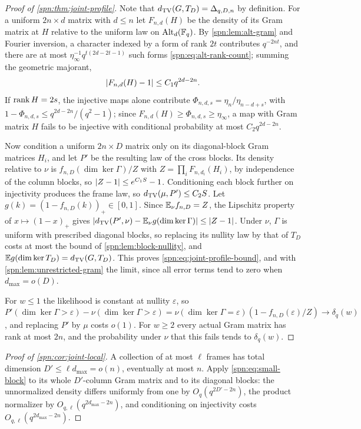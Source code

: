 \begin{proof}[Proof of \cref{spn:thm:joint-profile}]
Note that $d_{\mathrm{TV}}(G,T_D)=\Delta_{q,D,n}$ by definition. For a uniform $2n\times d$ matrix with
$d\le n$ let $F_{n,d}(H)$ be the density of its Gram matrix at $H$ relative to the uniform law on
$\operatorname{Alt}_d(\mathbb{F}_q)$. By \cref{spn:lem:alt-gram} and Fourier inversion, a character indexed by a form of
rank $2t$ contributes $q^{-2nt}$, and there are at most $\eta_\infty^{-1}q^{t(2d-2t-1)}$ such forms
\eqref{spn:eq:alt-rank-count}; summing the geometric majorant,
\begin{equation}\label{spn:eq:small-block}
 \lvert F_{n,d}(H)-1\rvert\le C_1q^{2d-2n}.
\end{equation}
If $\operatorname{rank} H=2s$, the injective maps alone contribute $\Phi_{n,d,s}=\eta_n/\eta_{n-d+s}$, with
$1-\Phi_{n,d,s}\le q^{2d-2n}/(q^2-1)$; since $F_{n,d}(H)\ge\Phi_{n,d,s}\ge\eta_\infty$, a map with Gram
matrix $H$ fails to be injective with conditional probability at most $C_2q^{2d-2n}$.

Now condition a uniform $2n\times D$ matrix only on its diagonal-block Gram matrices $H_i$, and let
$P'$ be the resulting law of the cross blocks. Its density relative to $\nu$ is
$f_{n,D}(\dim\ker\Gamma)/Z$ with $Z=\prod_iF_{n,d_i}(H_i)$, by independence of the column blocks, so
$\lvert Z-1\rvert\le e^{C_1S}-1$. Conditioning each block further on injectivity produces the frame law,
so $d_{\mathrm{TV}}(\mu,P')\le C_2S$. Let $g(k)=(1-f_{n,D}(k))_+\in[0,1]$. Since $\mathbb{E}_\nu f_{n,D}=Z$, the
Lipschitz property of $x\mapsto(1-x)_+$ gives
$\lvert d_{\mathrm{TV}}(P',\nu)-\mathbb{E}_\nu g(\dim\ker\Gamma)\rvert\le\lvert Z-1\rvert$. Under $\nu$, $\Gamma$ is uniform with
prescribed diagonal blocks, so replacing its nullity law by that of $T_D$ costs at most the bound of
\cref{spn:lem:block-nullity}, and $\mathbb{E} g(\dim\ker T_D)=d_{\mathrm{TV}}(G,T_D)$. This proves
\eqref{spn:eq:joint-profile-bound}, and with \cref{spn:lem:unrestricted-gram} the limit, since all
error terms tend to zero when $d_{\max}=o(D)$.

For $w\le1$ the likelihood is constant at nullity $\varepsilon$, so
$P'(\dim\ker\Gamma>\varepsilon)-\nu(\dim\ker\Gamma>\varepsilon)=\nu(\dim\ker\Gamma=\varepsilon)
(1-f_{n,D}(\varepsilon)/Z)\to\delta_q(w)$, and replacing $P'$ by $\mu$ costs $o(1)$. For $w\ge2$ every
actual Gram matrix has rank at most $2n$, and the probability under $\nu$ that this fails tends to
$\delta_q(w)$.
\end{proof}

\begin{proof}[Proof of \cref{spn:cor:joint-local}]
A collection of at most $\ell$ frames has total dimension $D'\le\ell d_{\max}=o(n)$, eventually at
most $n$. Apply \eqref{spn:eq:small-block} to its whole $D'$-column Gram matrix and to its diagonal
blocks: the unnormalized density differs uniformly from one by $O_q(q^{2D'-2n})$, the product
normalizer by $O_{q,\ell}(q^{2d_{\max}-2n})$, and conditioning on injectivity costs
$O_{q,\ell}(q^{2d_{\max}-2n})$.
\end{proof}


